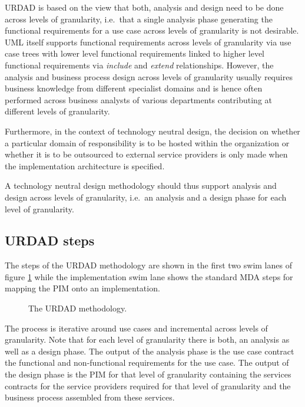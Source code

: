 \documentclass{IOS-Book-Article}
\begin{document}
URDAD is based on the view that both, analysis and design need to be done
across levels of granularity, i.e.\ that a single analysis phase generating
the functional requirements for a use case across levels of granularity
is not desirable. UML itself supports functional requirements across
levels of granularity via use case trees
with lower level functional requirements linked to higher level functional
requirements via {\em include} and {\em extend} relationships.
However, the analysis
and business process design across levels of granularity usually requires
business knowledge from different specialist domains and is hence often
performed across business analysts of various departments
contributing at different levels of granularity.

Furthermore, in the context of technology neutral design, the decision on
whether a particular domain of responsibility is to be hosted within the
organization or whether it is to be outsourced to external service providers is
only made when the implementation architecture is specified.

A technology neutral design methodology should thus support analysis and design
across levels of granularity, i.e.\ an analysis and a design phase for each
level of granularity.



\subsection{URDAD steps}

The steps of the URDAD methodology are shown in the first two swim lanes of
figure \ref{fig:methodology} while the implementation swim lane shows the
standard MDA steps for mapping the PIM onto an implementation.

\begin{figure}
  \centering
  \caption{The URDAD methodology.}
  \label{fig:methodology}
\end{figure}

The process is iterative around use cases and incremental across levels of
granularity. Note that for each level of granularity there is both, an analysis
as well as a design phase. The output of the analysis phase is the use
case contract the functional and non-functional requirements for the use
case. The output of the design phase is the PIM for that level of
granularity containing the services contracts for the service providers
required for that level of granularity and the business process assembled
from these services.
\end{document}
